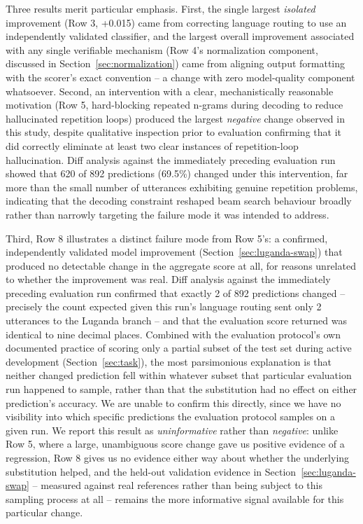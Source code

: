 \documentclass[11pt]{article}
\begin{document}
Three results merit particular emphasis. First, the single largest \emph{isolated} improvement (Row 3, +0.015) came from correcting language routing to use an independently validated classifier, and the largest overall improvement associated with any single verifiable mechanism (Row 4's normalization component, discussed in Section~\ref{sec:normalization}) came from aligning output formatting with the scorer's exact convention -- a change with zero model-quality component whatsoever. Second, an intervention with a clear, mechanistically reasonable motivation (Row 5, hard-blocking repeated n-grams during decoding to reduce hallucinated repetition loops) produced the largest \emph{negative} change observed in this study, despite qualitative inspection prior to evaluation confirming that it did correctly eliminate at least two clear instances of repetition-loop hallucination. Diff analysis against the immediately preceding evaluation run showed that 620 of 892 predictions (69.5\%) changed under this intervention, far more than the small number of utterances exhibiting genuine repetition problems, indicating that the decoding constraint reshaped beam search behaviour broadly rather than narrowly targeting the failure mode it was intended to address.

Third, Row 8 illustrates a distinct failure mode from Row 5's: a confirmed, independently validated model improvement (Section~\ref{sec:luganda-swap}) that produced no detectable change in the aggregate score at all, for reasons unrelated to whether the improvement was real. Diff analysis against the immediately preceding evaluation run confirmed that exactly 2 of 892 predictions changed -- precisely the count expected given this run's language routing sent only 2 utterances to the Luganda branch -- and that the evaluation score returned was identical to nine decimal places. Combined with the evaluation protocol's own documented practice of scoring only a partial subset of the test set during active development (Section~\ref{sec:task}), the most parsimonious explanation is that neither changed prediction fell within whatever subset that particular evaluation run happened to sample, rather than that the substitution had no effect on either prediction's accuracy. We are unable to confirm this directly, since we have no visibility into which specific predictions the evaluation protocol samples on a given run. We report this result as \emph{uninformative} rather than \emph{negative}: unlike Row 5, where a large, unambiguous score change gave us positive evidence of a regression, Row 8 gives us no evidence either way about whether the underlying substitution helped, and the held-out validation evidence in Section~\ref{sec:luganda-swap} -- measured against real references rather than being subject to this sampling process at all -- remains the more informative signal available for this particular change.
\end{document}
